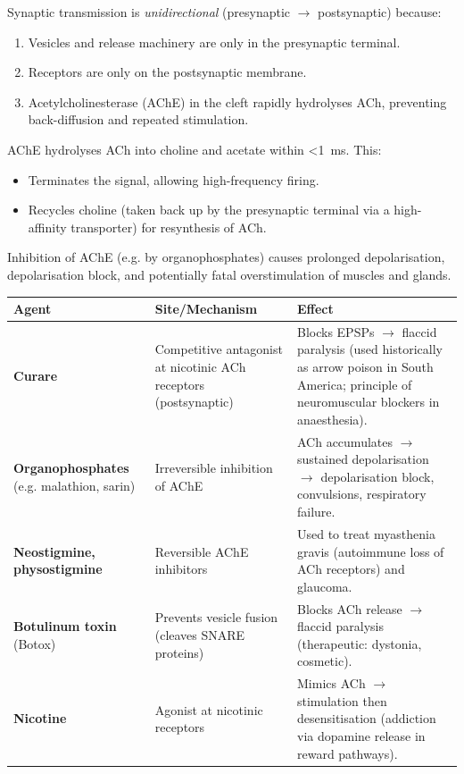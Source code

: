 \documentclass[11pt]{article}
\begin{document}
\begin{attention}
Synaptic transmission is \emph{unidirectional} (presynaptic $\to$ postsynaptic) because:
\begin{enumerate}
\item Vesicles and release machinery are only in the presynaptic terminal.
\item Receptors are only on the postsynaptic membrane.
\item Acetylcholinesterase (AChE) in the cleft rapidly hydrolyses ACh, preventing back-diffusion and repeated stimulation.
\end{enumerate}
\end{attention}

\begin{aretenir}
AChE hydrolyses ACh into choline and acetate within \SI{<1}{ms}. This:
\begin{itemize}
\item Terminates the signal, allowing high-frequency firing.
\item Recycles choline (taken back up by the presynaptic terminal via a high-affinity transporter) for resynthesis of ACh.
\end{itemize}
Inhibition of AChE (e.g. by organophosphates) causes prolonged depolarisation, depolarisation block, and potentially fatal overstimulation of muscles and glands.
\end{aretenir}

\begin{exemplebox}
\begin{center}
\begin{tabularx}{\linewidth}{|l|X|X|}\hline
\textbf{Agent} & \textbf{Site/Mechanism} & \textbf{Effect} \\ \hline
\textbf{Curare} & Competitive antagonist at nicotinic ACh receptors (postsynaptic) & Blocks EPSPs $\to$ flaccid paralysis (used historically as arrow poison in South America; principle of neuromuscular blockers in anaesthesia). \\ \hline
\textbf{Organophosphates} (e.g. malathion, sarin) & Irreversible inhibition of AChE & ACh accumulates $\to$ sustained depolarisation $\to$ depolarisation block, convulsions, respiratory failure. \\ \hline
\textbf{Neostigmine, physostigmine} & Reversible AChE inhibitors & Used to treat myasthenia gravis (autoimmune loss of ACh receptors) and glaucoma. \\ \hline
\textbf{Botulinum toxin} (Botox) & Prevents vesicle fusion (cleaves SNARE proteins) & Blocks ACh release $\to$ flaccid paralysis (therapeutic: dystonia, cosmetic). \\ \hline
\textbf{Nicotine} & Agonist at nicotinic receptors & Mimics ACh $\to$ stimulation then desensitisation (addiction via dopamine release in reward pathways). \\ \hline
\end{tabularx}
\end{center}
\end{exemplebox}
\end{document}
